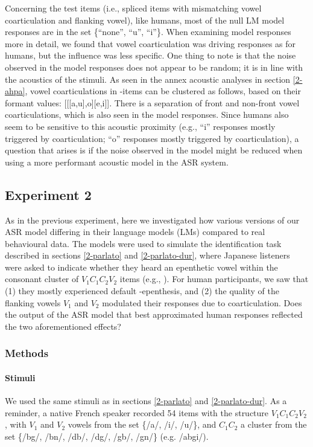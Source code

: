 {Concerning the test items (i.e., spliced items with mismatching vowel coarticulation and flanking vowel), like humans, most of the null LM model responses are in the set \{``none'', ``u'', ``i''\}. When examining model responses more in detail, we found that vowel coarticulation was driving responses as for humans, but the influence was less specific. One thing to note is that the noise observed in the model responses does not appear to be random; it is in line with the acoustics of the stimuli. As seen in the annex acoustic analyses in section \ref{2-ahpa}, vowel coarticulations in -items can be clustered as follows, based on their formant values: [[[a,u],o][e,i]]. There is a separation of front and non-front vowel coarticulations, which is also seen in the model responses. Since humans also seem to be sensitive to this acoustic proximity (e.g., ``i'' responses mostly triggered by \textipa{[i,e]} coarticulation; ``o'' responses mostly triggered by \textipa{[o,u]} coarticulation), a question that arises is if the noise observed in the model might be reduced when using a more performant acoustic model in the ASR system.      

\subsection{Experiment 2}
As in the previous experiment, here we investigated how various versions of our ASR model differing in their language models (LMs) compared to real behavioural data.
The models were used to simulate the identification task described in sections \ref{2-parlato} and \ref{2-parlato-dur}, where Japanese listeners were asked to indicate whether they heard an epenthetic vowel within the consonant cluster of $V_{1}C_{1}C_{2}V_{2}$ items (e.g., ). For human participants, we saw that (1) they mostly experienced default -epenthesis, and (2) the quality of the flanking vowels $V_{1}$ and $V_{2}$ modulated their responses due to coarticulation. Does the output of the ASR model that best approximated human responses reflected the two aforementioned effects? 

\subsubsection{Methods}
\paragraph{Stimuli}
We used the same stimuli as in sections \ref{2-parlato} and \ref{2-parlato-dur}. As a reminder, a native French speaker recorded 54 items with the structure $V_{1}C_{1}C_{2}V_{2}$, with $V_{1}$ and $V_{2}$ vowels from the set \{/a/, /i/, /u/\}, and $C_{1}C_{2}$ a cluster from the set \{/bg/, /bn/, /db/, /dg/, /gb/, /gn/\} (e.g. /abgi/).

}
